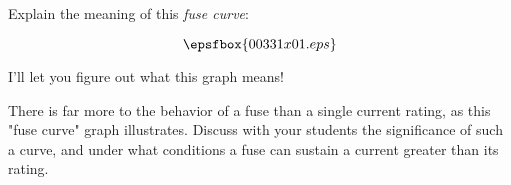 

Explain the meaning of this {\it fuse curve}:

$$\epsfbox{00331x01.eps}$$







I'll let you figure out what this graph means!







There is far more to the behavior of a fuse than a single current rating, as this "fuse curve" graph illustrates.  Discuss with your students the significance of such a curve, and under what conditions a fuse can sustain a current greater than its rating.




